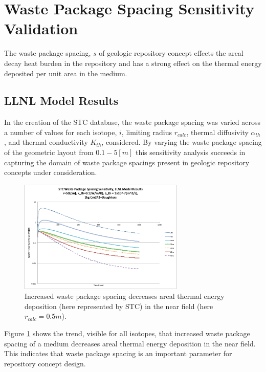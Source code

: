 \section{Waste Package Spacing Sensitivity Validation}\label{sec:spacing}
The waste package spacing, $s$ of geologic repository concept effects the areal 
decay heat burden in the repository and has a strong effect on the thermal 
energy deposited per unit area in the medium. 

\FloatBarrier
\subsection{LLNL Model Results}

In the creation of the \gls{STC} database, the waste package spacing was varied 
across a number of values for each isotope, $i$, limiting 
radius $r_{calc}$, thermal diffusivity $\alpha_{th}$, and thermal conductivity $K_{th}$, considered.  By 
varying the waste package spacing of the geometric layout from $0.1-5 [m]$
this sensitivity analysis succeeds in capturing the domain of 
waste package spacings present in geologic repository concepts under 
consideration. 

\begin{figure}[htbp!]
\begin{center}
\includegraphics[width=0.7\textwidth]{./chapters/demonstration/spacing/Cm242spacing_sens.eps}
\end{center}
\caption[$K_{th}$ Sensitivity to $s$]{Increased waste package 
spacing decreases areal thermal energy deposition 
(here represented by \gls{STC}) in the near field (here $r_{calc} = 0.5m$).}
\label{fig:Cm242spacing_sens}
\end{figure}

Figure \ref{fig:Cm242spacing_sens} shows the trend, visible for all isotopes, 
that increased waste package spacing of a medium decreases areal thermal energy 
deposition in the near field. This indicates that waste package spacing is 
an important parameter for repository concept design.

